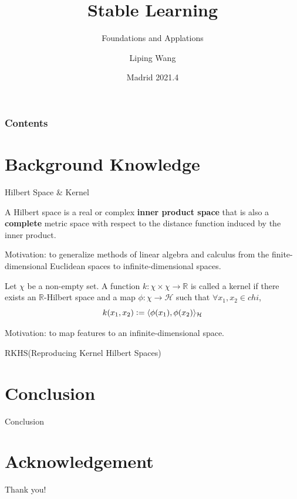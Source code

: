 \documentclass[10pt]{beamer}
\title[CRIPAC]{Stable Learning}
\subtitle{Foundations and Applations}
\author[Liping Wang]{Liping Wang}
\institute[wangliping2019@ia.ac.cn]{UCAS, CRIPAC}
\date[Institute of Autation 2022.4]
{Madrid 2021.4}
\newcommand{\defeq}{\vcentcolon=}
\begin{document}
\frame{\titlepage}
\begin{frame}
\frametitle{Contents}
\tableofcontents
\end{frame}
\section{Background Knowledge}

\begin{frame}{Hilbert Space \& Kernel}
\begin{definition}
	A Hilbert space is a real or complex \textbf{inner product space} that is also a \textbf{complete} metric space with respect to the distance function induced by the inner product.
\end{definition}

Motivation: to generalize methods of linear algebra and calculus from the finite-dimensional Euclidean spaces to infinite-dimensional spaces.

\begin{definition}[Kernel]
Let $\chi$ be a non-empty set. 
A function $k: \chi \times \chi\rightarrow \mathbb{R}$ is called a kernel if there exists an $\mathbb R$-Hilbert space and a map $\phi:\chi \rightarrow \mathcal H$ such that $\forall x_1, x_2\in chi$, 
\begin{equation}
	k(x_1, x_2) \defeq \langle\phi(x_1),\phi(x_2)\rangle_{\mathcal H}
\end{equation}   
\end{definition}
Motivation: to map features to an infinite-dimensional space.

\end{frame}

\begin{frame}{RKHS(Reproducing Kernel Hilbert Spaces)}




\end{frame}




\section{Conclusion}
    \begin{frame}{Conclusion}
    \end{frame}



\section*{Acknowledgement}  
\begin{frame}
\textcolor{myNewColorA}{\Huge{\centerline{Thank you!}}}
\end{frame}
\end{document}
